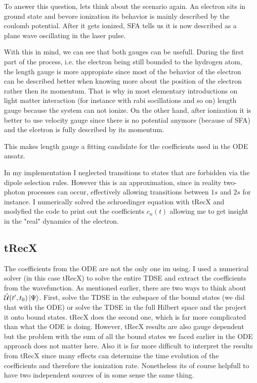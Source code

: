 To answer this question, lets think about the scenario again.
An electron sits in ground state and bevore ionization its behavior is mainly described by the coulomb potential.
After it gets ionized, SFA tells us it is now described as a plane wave oscillating in the laser pulse.

With this in mind, we can see that both gauges can be usefull.
During the first part of the process, i.e. the electron being still bounded to the hydrogen atom, the length gauge is more appropiate since most of the behavior of the electron can be described better when knowing more about the position of the electron rather then its momentum.
That is why in most elementary introductions on light matter interaction (for instance with rabi socillations and so on) length gauge because the system can not ionize.
On the other hand, after ionization it is better to use velocity gauge since there is no potential anymore (because of SFA) and the elcetron is fully described by its momentum.

This makes length gauge a fitting candidate for the coefficients used in the ODE ansatz.



\bigskip
In my implementation I neglected transitions to states that are forbidden via the dipole selection rules. 
However this is an approximation, since in reality two-photon processes can occur, effectively allowing transitions between $1s$ and $2s$ for instance. 
I numerically solved the schroedinger equation with tRecX and modyfied the code to print out the coefficients $c_n(t)$ allowing me to get insight in the "real" dynamics of the electron.


\subsection{tRecX}






The coefficients from the ODE are not the only one im using. I used a numerical solver (in this case tRecX) to solve the entire TDSE and extract the coefficients from the wavefunction.
As mentioned earlier, there are two ways to think about $\hat{\mathcal{U}}(t',t_0)\ket{\Psi}$. 
First, solve the TDSE in the subspace of the bound states (we did that with the ODE) or solve the TDSE in the full Hilbert space and the project it onto bound states. 
tRecX does the second one, which is far more complicated than what the ODE is doing.
However, tRecX results are also gauge dependent but the problem with the sum of all the bound states we faced earlier in the ODE approach does not matter here.
Also it is far more difficult to interpret the results from tRecX since many effects can determine the time evolution of the coefficients and therefore the ionization rate.
Nonetheless its of course helpfull to have two independent sources of in some sense the same thing.

